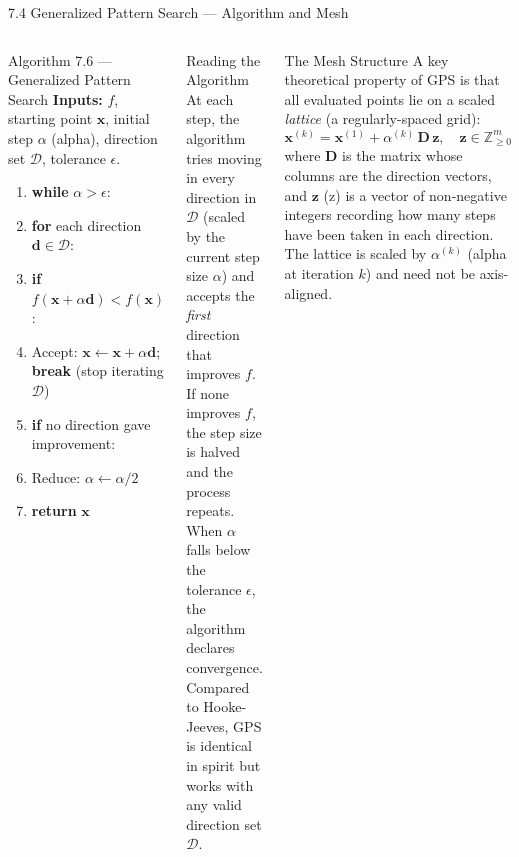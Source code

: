 \documentclass[aspectratio=169,10pt]{beamer}
\begin{document}
\begin{frame}[allowframebreaks]{7.4 Generalized Pattern Search --- Algorithm and Mesh}
  \begin{columns}[T]
      \begin{alertblock}{Algorithm 7.6 --- Generalized Pattern Search}
        \textbf{Inputs:} $f$, starting point $\mathbf{x}$, initial step
        $\alpha$ (alpha), direction set $\mathcal{D}$, tolerance $\epsilon$.
        \begin{enumerate}\setlength\itemsep{1pt}
          \item \textbf{while} $\alpha > \epsilon$:
          \item \quad \textbf{for} each direction $\mathbf{d} \in \mathcal{D}$:
          \item \qquad \textbf{if} $f(\mathbf{x} + \alpha\mathbf{d}) < f(\mathbf{x})$:
          \item \qquad\quad Accept: $\mathbf{x} \leftarrow
                \mathbf{x} + \alpha\mathbf{d}$; \textbf{break} (stop iterating $\mathcal{D}$)
          \item \quad \textbf{if} no direction gave improvement:
          \item \qquad Reduce: $\alpha \leftarrow \alpha / 2$
          \item \textbf{return} $\mathbf{x}$
        \end{enumerate}
      \end{alertblock}

      \begin{block}{Reading the Algorithm}
        At each step, the algorithm tries moving in every direction in
        $\mathcal{D}$ (scaled by the current step size $\alpha$) and
        accepts the \emph{first} direction that improves $f$.  If none
        improves $f$, the step size is halved and the process repeats.
        When $\alpha$ falls below the tolerance $\epsilon$, the
        algorithm declares convergence.  Compared to Hooke-Jeeves,
        GPS is identical in spirit but works with any valid direction
        set $\mathcal{D}$.
      \end{block}
      \begin{block}{The Mesh Structure}
        A key theoretical property of GPS is that all evaluated points
        lie on a scaled \emph{lattice} (a regularly-spaced grid):
        \[
          \mathbf{x}^{(k)} = \mathbf{x}^{(1)} +
          \alpha^{(k)}\, \mathbf{D}\,\mathbf{z},\quad
          \mathbf{z} \in \mathbb{Z}^m_{\ge 0}
        \]
        where $\mathbf{D}$ is the matrix whose columns are the
        direction vectors, and $\mathbf{z}$ (z) is a vector of
        non-negative integers recording how many steps have been taken
        in each direction.  The lattice is scaled by $\alpha^{(k)}$
        (alpha at iteration $k$) and need not be axis-aligned.
      \end{block}


\end{columns}
\end{frame}
\end{document}
